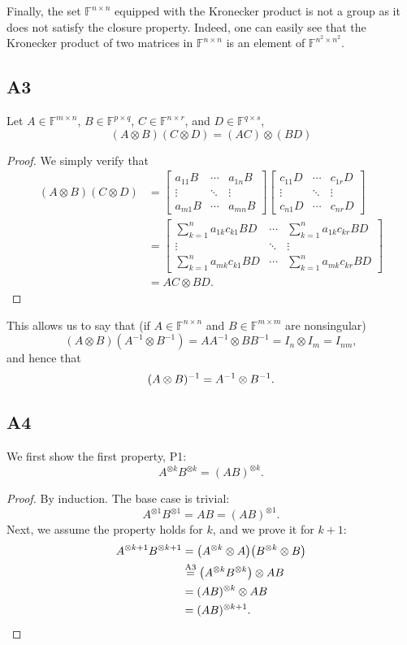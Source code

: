\documentclass[11pt]{article}
\newcommand{\field}{\mathbb{F}} %
\newcommand{\kp}{\otimes} %
\begin{document}
Finally, the set \(\field^{n \times n}\) equipped with the Kronecker product is not a group as it does not satisfy the closure property. Indeed, one can easily see that the Kronecker product of two matrices in \(\field^{n \times n}\) is an element of \(\field^{n^2 \times n^2}\).

\subsection*{A3}
Let \(A \in \field^{m \times n}\), \(B \in \field^{p \times q}\), \(C \in \field^{n \times r}\), and \(D \in \field^{q \times s}\),
\begin{equation*}
(A \kp B) (C \kp D)=(AC)\kp (BD)
\end{equation*}
\begin{proof}
We simply verify that
\begin{align*}
(A \kp B) (C \kp D) &= \begin{bmatrix}
a_{11} B & \cdots & a_{1n}B \\
\vdots & \ddots & \vdots \\
a_{m1} B & \cdots & a_{mn} B
\end{bmatrix} \begin{bmatrix}
c_{11} D & \cdots & c_{1r} D \\
\vdots & \ddots & \vdots \\
c_{n1} D & \cdots & c_{nr} D
\end{bmatrix}\\
&= \begin{bmatrix}
\sum_{k=1}^n a_{1k} c_{k1} BD & \cdots & \sum_{k=1}^n a_{1k} c_{kr} BD \\
\vdots & \ddots & \vdots \\
\sum_{k=1}^n a_{mk} c_{k1} BD & \cdots & \sum_{k=1}^n a_{mk} c_{kr} BD
\end{bmatrix}\\
&= AC \kp BD.
\end{align*}
\end{proof}

This allows us to say that (if \(A \in \field^{n \times n}\) and \(B \in \field^{m \times m}\) are nonsingular)
\[
(A \kp B)(A^{-1} \kp B^{-1}) = AA^{-1} \kp BB^{-1} = I_n \kp I_m = I_{nm},
\]
and hence that
\[
(A \kp B)^{-1} = A^{-1} \kp B^{-1}.\qedhere
\]

\subsection*{A4}
We first show the first property, P1:
\[
A^{\kp k} B^{\kp k} = (AB)^{\kp k}.
\]
\begin{proof}
By induction.
The base case is trivial:
\[
A^{\kp 1} B^{\kp 1} = AB = (AB)^{\kp 1}.
\]
Next, we assume the property holds for $k$, and we prove it for $k+1$:
\begin{align*}
A^{\kp k+1} B^{\kp k+1} &= \big(A^{\kp k} \kp A\big) \big(B^{\kp k} \kp B\big)\\
&\overset{\textnormal{A3}}{=}\big(A^{\kp k} B^{\kp k}\big) \kp AB\\
&= (AB)^{\kp k} \kp AB\\
&= (AB)^{\kp k+1}.\qedhere
\end{align*}
\end{proof}
\end{document}
